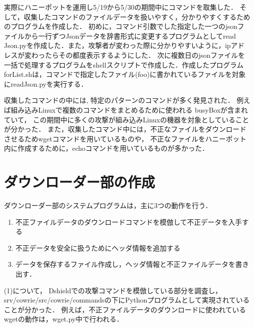 \documentclass[dvipdfmx]{bta}
\begin{document}
実際にハニーポットを運用し5/19から5/30の期間中にコマンドを取集した．
そして，収集したコマンドのファイルデータを扱いやすく，分かりやすくするためのプログラムを作成した．
初めに，コマンド引数でした指定した一つのjsonファイルから一行ずつJsonデータを辞書形式に変更するプログラムとしてread Json.pyを作成した．また，攻撃者が変わった際に分かりやすいように，ipアドレスが変わったらその都度表示するようにした．
次に複数日のjsonファイルを一括で処理するプログラムをshellスクリプトで作成した．作成したプログラムforList.shは，コマンドで指定したファイル(foo)に書かれているファイルを対象にreadJson.pyを実行する．

収集したコマンドの中には,
特定のパターンのコマンドが多く発見された．
例えば組み込みLinuxで複数のコマンドをまとめるために使われる
busyBoxが含まれていて，
この期間中に多くの攻撃が組み込みLinuxの機器を対象としていることが分かった．
また，収集したコマンド中には，不正なファイルをダウンロードさせるためwgetコマンドを用いているものや，
不正なファイルをハニーポット内に作成するために，echoコマンドを用いているものが多かった．

\chapter{ダウンローダー部の作成}
ダウンローダー部のシステムプログラムは，主に3つの動作を行う．

\renewcommand{\labelenumi}{(\arabic{enumi})}
\begin{enumerate}
	\item 不正ファイルデータのダウンロードコマンドを模倣して不正データを入手する
	\item 不正データを安全に扱うためにヘッダ情報を追加する
	\item データを保存するファイル作成し，ヘッダ情報と不正ファイルデータを書き出す．
\end{enumerate}

(1)について，
Dshieldでの攻撃コマンドを模倣している部分を調査し，
srv/cowrie/src/cowrie/commandsの下にPythonプログラムとして実現されていることが分かった．
例えば，不正ファイルデータのダウンロードに使われているwgetの動作は，wget.py中で行われる．

\begin{figure}[htbp]



\end{figure}
\end{document}
